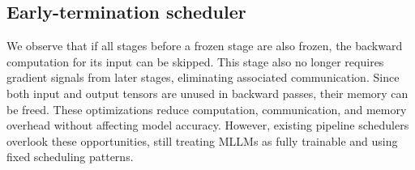 \documentclass[conference]{IEEEtran}
\begin{document}
\subsection{Early-termination scheduler}
\label{section:3-c}
We observe that if all stages before a frozen stage are also frozen, the backward computation for its input can be skipped. This stage also no longer requires gradient signals from later stages, eliminating associated communication. Since both input and output tensors are unused in backward passes, their memory can be freed. These optimizations reduce computation, communication, and memory overhead without affecting model accuracy. However, existing pipeline schedulers overlook these opportunities, still treating MLLMs as fully trainable and using fixed scheduling patterns.
\end{document}
